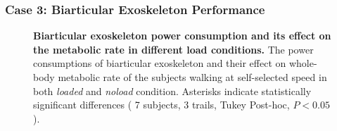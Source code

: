 \documentclass[10pt,letterpaper]{article}
\begin{document}
\subsubsection*{Case 3: Biarticular Exoskeleton Performance}
\begin{figure}[ht!]
	\centering
	\hfil
	\vspace{1mm}
	\caption{\small{\textbf{Biarticular exoskeleton power consumption and its effect on the metabolic rate in different load conditions.} The power consumptions of biarticular exoskeleton and their effect on whole-body metabolic rate of the subjects walking at self-selected speed in both {\it loaded} and {\it noload} condition. Asterisks indicate statistically significant differences ( 7 subjects, 3 trails, Tukey Post-hoc, $P < 0.05$).}}
	\label{Fig_Case03_Energy_Plot}
\end{figure}
\end{document}

